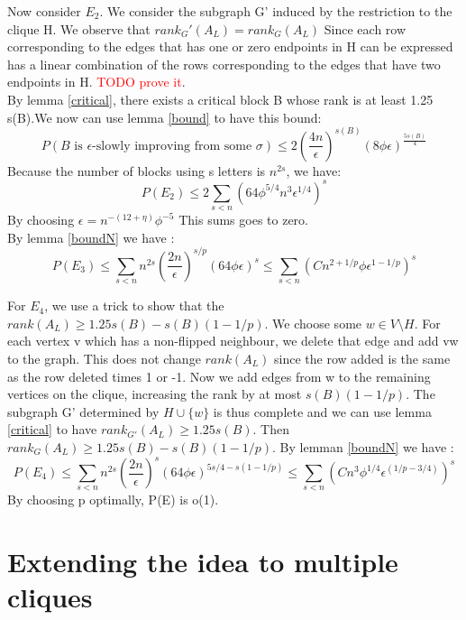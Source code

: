 \documentclass[12pt]{article}
\begin{document}
Now consider $E_2$. We consider the subgraph G' induced by the restriction to the clique H. We observe that $rank_G'(A_L) = rank_G(A_L)$ Since each row corresponding to the edges that has one or zero endpoints in H can be expressed has a linear combination of the rows corresponding to the edges that have two endpoints in H. \textcolor{red}{TODO prove it}. \\
By lemma \ref{critical}, there exists a critical block B whose rank is at least 1.25 s(B).We now can use lemma \ref{bound} to have this bound:
\begin{equation*}
P(B \text{ is }\epsilon \text {-slowly improving from some }\sigma) \leq 2(\frac{4n}{\epsilon})^{s(B)}(8\phi\epsilon)^{\frac{5s(B)}{4}}
\end{equation*}
Because the number of blocks using s letters is $n^{2s}$, we have:
\begin{equation*}
P(E_2) \leq 2 \sum_{s < n}(64\phi^{5/4}n^3\epsilon^{1/4})^s
\end{equation*}
By choosing $\epsilon = n^{-(12 + \eta)}\phi^{-5}$ This sums goes to zero.\\

By lemma \ref{boundN} we have :
\begin{equation*}
P(E_3) \leq  \sum_{s < n}n^{2s}(\dfrac{2n}{\epsilon})^{s/p}(64\phi\epsilon)^{s} \leq \sum_{s < n}(Cn^{2 + 1/p}\phi\epsilon^{1 - 1/p})^{s}
\end{equation*}

For $E_4$, we use a trick to show that the $rank(A_L) \geq 1.25s(B) - s(B)(1 - 1/p)$. We choose some $w \in V \setminus H$. For each vertex v which has a non-flipped neighbour, we delete that edge and add vw to the graph. This does not change $rank(A_L)$ since the row added is the same as the row deleted times 1 or -1. Now we add edges from w to the remaining vertices on the clique, increasing the rank by at most $s(B)(1 - 1/p)$. The subgraph G' determined by $H \cup \{w\}$ is thus complete and we can use  lemma \ref{critical} to have $rank_{G'}(A_L) \geq 1.25 s(B)$. Then $rank_G(A_L) \geq 1.25s(B) - s(B)(1 - 1/p)$.
By lemman \ref{boundN} we have :
\begin{equation*}
P(E_4) \leq  \sum_{s < n}n^{2s}(\dfrac{2n}{\epsilon})^{s}(64\phi\epsilon)^{5s/4 - s(1 - 1/p)} \leq \sum_{s < n}(Cn^{3}\phi^{1/4}\epsilon^{(1/p - 3/4)})^{s}
\end{equation*}
By choosing p optimally, P(E) is o(1). 

\section{Extending the idea to multiple cliques}
\end{document}
